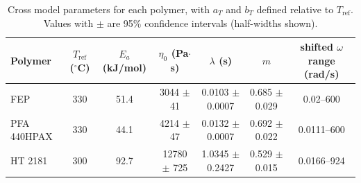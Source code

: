 \begin{table}[htbp]
\centering
\begin{tabular}{lcccccc}
\toprule
Polymer & $T_{\mathrm{ref}}$ ($^\circ$C) & $E_a$ (kJ/mol) & $\eta_0$ (Pa$\cdot$s) & $\lambda$ (s) & $m$ & shifted $\omega$ range (rad/s) \\
\midrule
FEP & 330 & 51.4 & 3044 $\pm$ 41 & 0.0103 $\pm$ 0.0007 & 0.685 $\pm$ 0.029 & 0.02--600 \\
PFA 440HPAX & 330 & 44.1 & 4214 $\pm$ 47 & 0.0132 $\pm$ 0.0007 & 0.692 $\pm$ 0.022 & 0.0111--600 \\
HT 2181 & 300 & 92.7 & 12780 $\pm$ 725 & 1.0345 $\pm$ 0.2427 & 0.529 $\pm$ 0.015 & 0.0166--924 \\
\bottomrule
\end{tabular}
\caption{Cross model parameters for each polymer, with $a_T$ and $b_T$ defined relative to $T_{\mathrm{ref}}$. Values with $\pm$ are 95\% confidence intervals (half-widths shown).}
\label{tab:cross_model_parameters}
\end{table}
